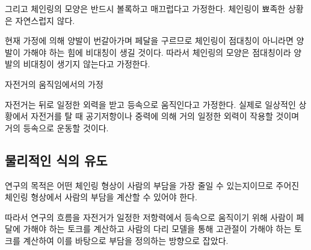 그리고 체인링의 모양은 반드시 볼록하고 매끄럽다고 가정한다. 체인링이 뾰족한 상황은 자연스럽지 않다.

현재 가정에 의해 양발이 번갈아가며 페달을 구르므로 체인링이 점대칭이 아니라면 양발이 가해야 하는 힘에 비대칭이 생길 것이다. 따라서 체인링의 모양은 점대칭이라 양발의 비대칭이 생기지 않는다고 가정한다.

자전거의 움직임에서의 가정

자전거는 뒤로 일정한 외력을 받고 등속으로 움직인다고 가정한다. 실제로 일상적인 상황에서 자전거를 탈 때 공기저항이나 중력에 의해 거의 일정한 외력이 작용할 것이며 거의 등속으로 운동할 것이다.

\subsection{물리적인 식의 유도}

연구의 목적은 어떤 체인링 형상이 사람의 부담을 가장 줄일 수 있는지이므로 주어진 체인링 형상에서 사람의 부담을 계산할 수 있어야 한다.

따라서 연구의 흐름을 자전거가 일정한 저항력에서 등속으로 움직이기 위해 사람이 페달에 가해야 하는 토크를 계산하고 사람의 다리 모델을 통해 고관절이 가해야 하는 토크를 계산하여 이를 바탕으로 부담을 정의하는 방향으로 잡았다.

